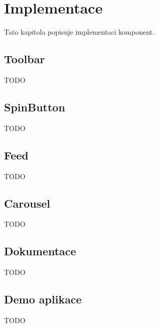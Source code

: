 \chapter{Implementace}

Tato kapitola popisuje implementaci komponent.

\section{Toolbar}

TODO

\section{SpinButton}

TODO

\section{Feed}

TODO

\section{Carousel}

TODO

\section{Dokumentace}

TODO

\section{Demo aplikace}

TODO
